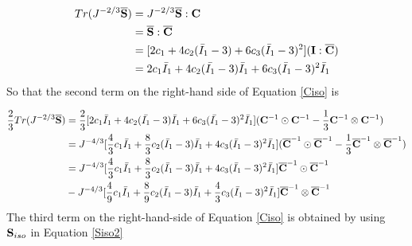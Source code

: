 \begin{equation}
\begin{split}
Tr(J^{-2/3}\overline{\bold{S}}) &= J^{-2/3}\overline{\bold{S}}:\bold{C} \\
&= \overline{\bold{S}} : \overline{\bold{C}} \\
&=  [2c_1 + 4c_2(\bar{I}_1 - 3) + 6c_3(\bar{I}_1 - 3)^2] (\bold{I} : \overline{\bold{C}}) \\
&= 2c_1\bar{I}_1 + 4c_2(\bar{I_1} - 3)\bar{I}_1 + 6c_3(\bar{I}_1 - 3)^2\bar{I}_1
\end{split}
\end{equation}
So that the second term on the right-hand side of Equation \ref{Ciso} is

\begin{equation} \label{part22}
\begin{split}
\frac{2}{3}Tr(J^{-2/3}\overline{\bold{S}})
&= \frac{2}{3} [2c_1\bar{I}_1 + 4c_2(\bar{I_1} - 3)\bar{I}_1 + 6c_3(\bar{I_1} - 3)^2\bar{I}_1] ({{\bold{C}}}^{-1} \odot {{\bold{C}}}^{-1} - \frac{1}{3}{{\bold{C}}}^{-1} \otimes {{\bold{C}}}^{-1}) \\
&= J^{-4/3}[\frac{4}{3}c_1{\bar{I}}_1 + \frac{8}{3}c_2({\bar{I}}_1 - 3){\bar{I}}_1 + 4c_3({\bar{I}}_1 - 3)^2{\bar{I}}_1]({\overline{\bold{C}}}^{-1} \odot {\overline{\bold{C}}}^{-1} - \frac{1}{3}{\overline{\bold{C}}}^{-1} \otimes {\overline{\bold{C}}}^{-1}) \\
&= J^{-4/3} [\frac{4}{3}c_1{\bar{I}}_1 + \frac{8}{3}c_2({\bar{I}}_1 - 3){\bar{I}}_1 + 4c_3({\bar{I}}_1 - 3)^2{\bar{I}}_1]{\overline{\bold{C}}}^{-1} \odot {\overline{\bold{C}}}^{-1} \\
&-  J^{-4/3}[\frac{4}{9}c_1{\bar{I}}_1 + \frac{8}{9}c_2({\bar{I}}_1 - 3){\bar{I}}_1 + \frac{4}{3}c_3({\bar{I}}_1 - 3)^2{\bar{I}}_1]{\overline{\bold{C}}}^{-1} \otimes {\overline{\bold{C}}}^{-1} 
\end{split}
\end{equation}
The third term on the right-hand-side of Equation \ref{Ciso} is obtained by using $\bold{S}_{iso}$ in Equation \ref{Siso2}

